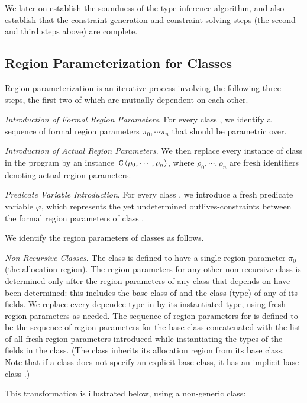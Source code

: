 We later on establish the soundness of the type inference algorithm, and also establish
that the constraint-generation and constraint-solving steps (the second and third steps
above) are complete.

\subsection{Region Parameterization for Classes}
\label{sec:fb-templatization}

Region parameterization is an iterative process involving the following three steps,
the first two of which are mutually dependent on each other.

\emph{Introduction of Formal Region Parameters}.
For every class , we identify a sequence of formal region parameters
$\pi_0, \cdots \pi_n$ that  should be parametric over.

\emph{Introduction of Actual Region Parameters}.
We then replace every instance of class  in the program by an instance
$\,{\tt C}\,\langle \rho_0, \cdots, \rho_n \rangle$, where $\rho_0, \cdots, \rho_n$
are fresh identifiers denoting actual region parameters.

\emph{Predicate Variable Introduction}. For every class , we introduce
a fresh predicate variable $\varphi$, which represents the yet undetermined
outlives-constraints between the formal region parameters of class .

We identify the region parameters of classes as follows.

\emph{Non-Recursive Classes}.
The class  is defined to have a single region parameter $\pi_0$ (the allocation region).
The region parameters for any other non-recursive class  is determined
only after the region parameters of any class that  depends on have been
determined: this includes the base-class  of  and the class (type)
of any of its fields.
We replace every dependee type  in  by its instantiated type,
using fresh region parameters as needed.
The sequence of region parameters for  is defined to be
the sequence of region parameters for the base class  concatenated
with the list of all  fresh region parameters introduced while instantiating the types
of the fields in the class.
(The class inherits its allocation region from its base class. Note that if
a class does not specify an explicit base class, it has an implicit base class
.)

This transformation is illustrated below, using a non-generic  class:

